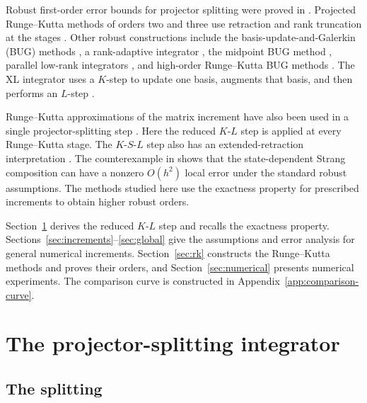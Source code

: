 \documentclass[]{article}
\numberwithin{equation}{section}
\theoremstyle{plain}
\theoremstyle{remark}
\numberwithin{algorithm}{section}
\begin{document}
Robust first-order error bounds for projector splitting were proved in
\cite{KieriLubichWalach2016}.  Projected
Runge--Kutta methods of orders two and three use retraction and rank
truncation at the stages \cite{KieriVandereycken2019}.  Other robust
constructions include the basis-update-and-Galerkin (BUG) methods
\cite{CerutiLubich2022}, a rank-adaptive integrator
\cite{CerutiKuschLubich2022}, the midpoint BUG method
\cite{CerutiEinkemmerKuschLubich2024}, parallel low-rank integrators
\cite{Kusch2025}, and high-order Runge--Kutta BUG methods
\cite{NobileRiffaud2026}.  The XL integrator uses a \(K\)-step to update
one basis, augments that basis, and then performs an \(L\)-step
\cite{einkemmer2025asymptotic}.

Runge--Kutta approximations of the matrix increment have also been used in
a single projector-splitting step \cite{HochbruckNeherSchrammer2023}.
Here the reduced \(K\)-\(L\) step is applied at every Runge--Kutta stage.
The \(K\)-\(S\)-\(L\) step also has an extended-retraction interpretation
\cite{AbsilOseledets2015,SeguinCerutiKressner2024}.
The counterexample in \cite{Zhang2026Counterexample} shows that the
state-dependent Strang composition can have a nonzero \(O(h^2)\) local
error under the standard robust assumptions.  The methods studied here
use the exactness property for prescribed increments to obtain higher
robust orders.

Section~\ref{sec:psi} derives the reduced \(K\)-\(L\) step and recalls
the exactness property.  Sections~\ref{sec:increments}--\ref{sec:global}
give the assumptions and error analysis for general numerical increments.
Section~\ref{sec:rk} constructs the Runge--Kutta methods and proves their
orders, and Section~\ref{sec:numerical} presents numerical experiments.
The comparison curve is constructed in Appendix~\ref{app:comparison-curve}.

\section{The projector-splitting integrator}
\label{sec:psi}

\subsection{The splitting}
\label{sec:splitting}
\end{document}
